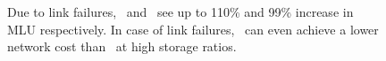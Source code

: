 \begin{figure}[t]
\begin{center}
\end{center}
\caption{Due to link failures, \invlru\ and \optrpfuture\ see up to  110\% and 99\% increase in MLU respectively. In case of link failures, \invlru\ can even achieve a lower network cost than \optrpfuture\ at high storage ratios.}
\label{fig:linkfailurecompare}
\end{figure}


